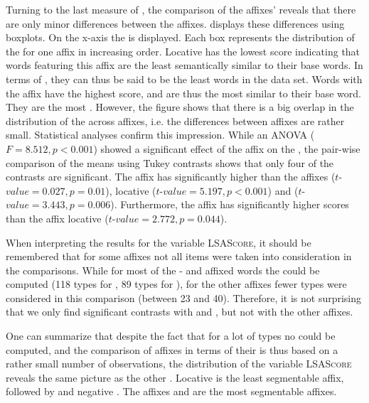 Turning to the last measure of , the comparison of the affixes'  reveals that there are only minor differences between the affixes.  displays these differences using boxplots. On the x-axis the  is displayed. Each box represents the distribution of the  for one affix in increasing order. Locative  has the lowest score indicating that words featuring this affix are the least semantically similar to their base words. In terms of , they can thus be said to be the least  words in the data set. Words with the affix  have the highest score, and are thus the most similar to their base word. They are the most .
However, the figure shows that there is a big overlap in the distribution of the  across affixes, i.e. the differences between affixes are rather small. Statistical analyses confirm this impression.
While an ANOVA ($F=8.512, p< 0.001$) showed a significant effect of the affix on the , the pair-wise comparison of the means using Tukey contrasts shows  that only four of the contrasts are significant. The affix  has significantly higher  than the affixes  ($t$-$value=0.027, p=0.01$), locative  ($t$-$value=5.197, p< 0.001$) and   ($t$-$value=3.443, p=0.006$). Furthermore, the affix  has significantly higher scores than the  affix locative  ($t$-$value=2.772, p=0.044$). 



        When interpreting the results for the variable \textsc{LSAScore}, it should be remembered that for some affixes not all items were taken into consideration in the comparisons. While for most of the - and affixed words the  could be computed (118 types for , 89 types for ), for the other affixes fewer types were considered in this comparison (between 23 and 40). Therefore, it is not surprising that we only find significant contrasts with  and , but not with the other affixes.  
        
        One can summarize that despite the fact that for a lot of types no  could be computed, and the comparison of affixes in terms of their  is thus based on a rather small number of observations, the distribution of the variable \textsc{LSAScore} reveals the same picture as the other . Locative  is the least segmentable affix, followed by  and negative . The affixes  and  are the most segmentable affixes. 
        
